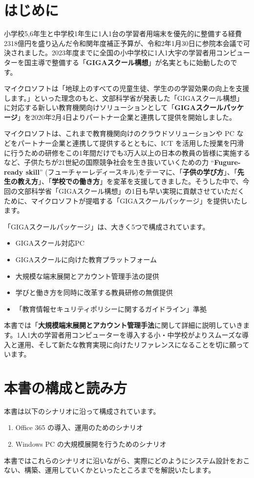 \section*{はじめに}

小学校5,6年生と中学校1年生に1人1台の学習者用端末を優先的に整備する経費 2318億円を盛り込んだ令和関年度補正予算が、令和2年1月30日に参院本会議で可決されました。2023年度までに全国の小中学校に1人1大宇の学習者用コンピューターを国主導で整備する「\textbf{GIGAスクール構想}」が名実ともに始動したのです。

マイクロソフトは「地球上のすべての児童生徒、学生のの学習効果の向上を支援します。」といった理念のもと、文部科学省が発表した「GIGAスクール構想」に対応する新しい教育機関向けソリューションとして「\textbf{GIGAスクールパッケージ}」を2020年2月4日よりパートナー企業と連携して提供を開始しました。

マイクロソフトは、これまで教育機関向けのクラウドソリューションや PC などをパートナー企業と連携して提供するとともに、ICT を活用した授業を円滑に行うための研修をこの1年間だけでも3万人以上の日本の教員の皆様に実施するなど、子供たちが21世紀の国際競争社会を生き抜いていくための力 ``\textbf{Fugure-ready skill}'' (フューチャーレディースキル)をテーマに、「\textbf{子供の学び方}」、「\textbf{先生の教え方}」、「\textbf{学校での働き方}」を変革を支援してきました。そうした中で、今回の文部科学省「GIGAスクール構想」の1日も早い実現に貢献させていただくために、マイクロソフトが提唱する「GIGAスクールパッケージ」を提供いたします。

「GIGAスクールパッケージ」は、大きく5つで構成されています。

\begin{itemize}
    \item GIGAスクール対応PC
    \item GIGAスクールに向けた教育プラットフォーム
    \item 大規模な端末展開とアカウント管理手法の提供
    \item 学びと働き方を同時に改革する教員研修の無償提供
    \item 「教育情報セキュリティポリシーに関するガイドライン」準拠
\end{itemize}

本書では「\textbf{大規模端末展開とアカウント管理手法}に関して詳細に説明していきます。1人1大の学習者用コンピューターを導入する小・中学校がよりスムーズな導入と運用、そして新たな教育実現に向けたリファレンスになることを切に願っています。

\section*{本書の構成と読み方}

本書は以下のシナリオに沿って構成されています。

\begin{enumerate}
    \item Office 365 の導入、運用のためのシナリオ
    \item Windows PC の大規模展開を行うためのシナリオ
\end{enumerate}

本書ではこれらのシナリオに沿いながら、実際にどのようにシステム設計をおこない、構築、運用していくかといったところまでを解説いたします。